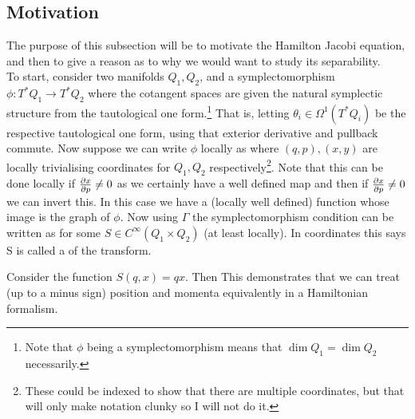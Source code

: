\documentclass{article}
\begin{document}
\subsection{Motivation}
The purpose of this subsection will be to motivate the Hamilton Jacobi equation, and then to give a reason as to why we would want to study its separability. \\
To start, consider two manifolds $Q_1, Q_2$, and a symplectomorphism $\phi : T^\ast Q_1 \to T^\ast Q_2$ where the cotangent spaces are given the natural symplectic structure from the tautological one form.\footnote{Note that $\phi$ being a symplectomorphism means that $\dim Q_1 = \dim Q_2$ necessarily.} That is, letting $\theta_i \in \Omega^1(T^\ast Q_i)$ be the respective tautological one form,
using that exterior derivative and pullback commute. Now suppose we can write $\phi$ locally as 
where $(q,p), (x,y)$ are locally trivialising coordinates for $Q_1, Q_2$ respectively\footnote{These could be indexed to show that there are multiple coordinates, but that will only make notation clunky so I will not do it.}. Note that this can be done locally if $\pd[x]{p} \neq 0$ as we certainly have a well defined map 
and then if $\pd[x]{p} \neq 0$ we can invert this. In this case we have a (locally well defined) function
whose image is the graph of $\phi$. Now using $\Gamma$ the symplectomorphism condition can be written as 
for some $S \in C^\infty(Q_1 \times Q_2)$ (at least locally). In coordinates this says 
S is called a  of the transform. 

\begin{example}
Consider the function $S(q,x) = qx$. Then 
This demonstrates that we can treat (up to a minus sign) position and momenta equivalently in a Hamiltonian formalism. 
\end{example}
\end{document}
